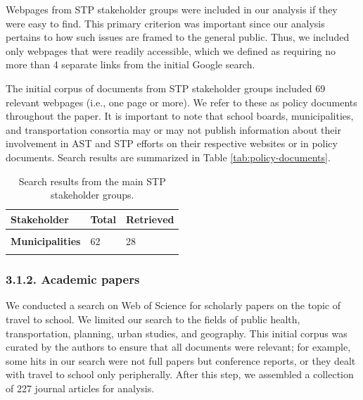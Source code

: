 \documentclass[]{elsarticle} %
\begin{document}
Webpages from STP stakeholder groups were included in our analysis if
they were easy to find. This primary criterion was important since our
analysis pertains to how such issues are framed to the general public.
Thus, we included only webpages that were readily accessible, which we
defined as requiring no more than 4 separate links from the initial
Google search.

The initial corpus of documents from STP stakeholder groups included 69
relevant webpages (i.e., one page or more). We refer to these as policy
documents throughout the paper. It is important to note that school
boards, municipalities, and transportation consortia may or may not
publish information about their involvement in AST and STP efforts on
their respective websites or in policy documents. Search results are
summarized in Table \ref{tab:policy-documents}.

\begin{table}

\caption{\label{tab:policy-documents}\label{tab:search-results}Search results from the main STP stakeholder groups.}
\centering
\begin{tabular}[t]{>{}l|l|>{}l}
\toprule
Stakeholder & Total & Retrieved\\
\midrule
\cellcolor{gray!6}{\textbf{School boards}} & \cellcolor{gray!6}{62} & \cellcolor{gray!6}{32}\\
\textbf{Municipalities} & 62 & 28\\
\cellcolor{gray!6}{\textbf{Transportation consortia}} & \cellcolor{gray!6}{39} & \cellcolor{gray!6}{9}\\
\bottomrule
\end{tabular}
\end{table}

\hypertarget{academic-papers}{%
\subsubsection{3.1.2. Academic papers}\label{academic-papers}}

We conducted a search on Web of Science for scholarly papers on the
topic of travel to school. We limited our search to the fields of public
health, transportation, planning, urban studies, and geography. This
initial corpus was curated by the authors to ensure that all documents
were relevant; for example, some hits in our search were not full papers
but conference reports, or they dealt with travel to school only
peripherally. After this step, we assembled a collection of 227 journal
articles for analysis.
\end{document}
